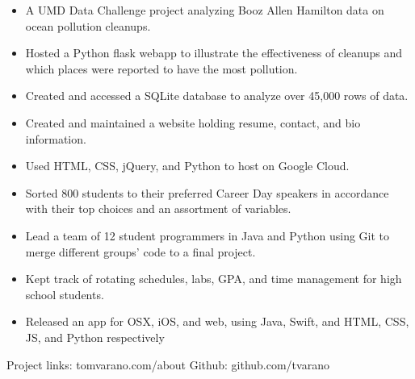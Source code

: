 \documentclass[11pt]{article}
\begin{document}
\vspace{2mm}
{\fontsize{10}{12}\robotocondlight
\begin{itemize}[noitemsep,nolistsep]
    \item A UMD Data Challenge project analyzing Booz Allen Hamilton data on ocean pollution cleanups. 
    \item Hosted a {\robotocond Python flask} webapp to illustrate the effectiveness of cleanups and which places were reported to have the most pollution. 
    \item Created and accessed a {\robotocond SQLite} database to analyze over 45,000 rows of data.
\end{itemize}
{\fontsize{10}{12}\robotocondlight
\begin{itemize}[noitemsep,nolistsep]
    \item Created and maintained a website holding resume, contact, and bio information.
    \item Used {\robotocond HTML}, {\robotocond CSS}, {\robotocond jQuery}, and {\robotocond Python} to host on {\robotocond Google Cloud}.
\end{itemize}
\begin{itemize}[noitemsep,nolistsep]
    \item Sorted 800 students to their preferred Career Day speakers in accordance with their top choices and an assortment of variables.
    \item Lead a team of 12 student programmers in {\robotocond Java} and {\robotocond Python} using {\robotocond Git} to merge different groups’ code to a final project.
\end{itemize}
\begin{itemize}[noitemsep,nolistsep]
    \item Kept track of rotating schedules, labs, GPA, and time management for high school students. 
    \item Released an app for OSX, iOS, and web, using {\robotocond Java}, {\robotocond Swift},
     and {\robotocond HTML}, {\robotocond CSS}, {\robotocond JS}, and {\robotocond Python} respectively
\end{itemize}
{\fontsize{8}{10}\robotocondlight Project links: tomvarano.com/about \hfill Github: github.com/tvarano
}
\vspace{-5mm}
\hsep
\vspace{-3mm}

}}
\end{document}
